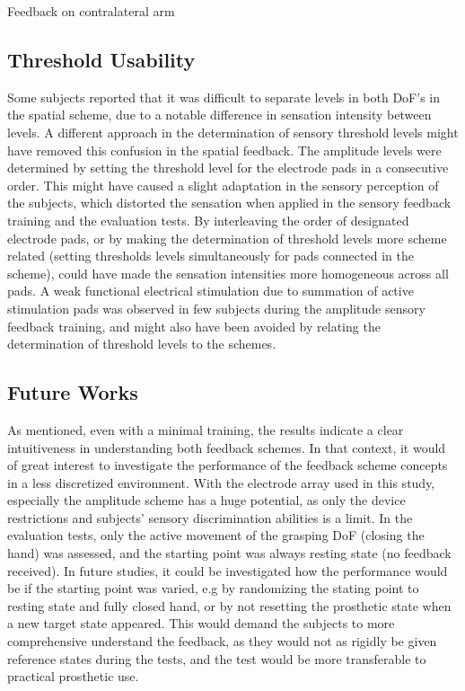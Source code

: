 Feedback on contralateral arm 

\subsection{Threshold Usability }
Some subjects reported that it was difficult to separate levels in both DoF's in the spatial scheme, due to a notable difference in sensation intensity between levels. A different approach in the determination of sensory threshold levels might have removed this confusion in the spatial feedback. The amplitude levels were determined by setting the threshold level for the electrode pads in a consecutive order. This might have caused a slight adaptation in the sensory perception of the subjects, which distorted the sensation when applied in the sensory feedback training and the evaluation tests. By interleaving the order of designated electrode pads, or by making the determination of threshold levels more scheme related (setting thresholds levels simultaneously for pads connected in the scheme), could have made the sensation intensities more homogeneous across all pads. A weak functional electrical stimulation due to summation of active stimulation pads was observed in few subjects during the amplitude sensory feedback training, and might also have been avoided by relating the determination of threshold levels to the schemes. 

\subsection{Future Works}
As mentioned, even with a minimal training, the results indicate a clear intuitiveness in understanding both feedback schemes. In that context, it would of great interest to investigate the performance of the feedback scheme concepts in a less discretized environment. With the electrode array used in this study, especially the amplitude scheme has a huge potential, as only the device restrictions and subjects' sensory discrimination abilities is a limit.
In the evaluation tests, only the active movement of the grasping DoF (closing the hand) was assessed, and the starting point was always resting state (no feedback received). In future studies, it could be investigated how the performance would be if the starting point was varied, e.g by randomizing the stating point to resting state and fully closed hand, or by not resetting the prosthetic state when a new target state appeared. This would demand the subjects to more comprehensive understand the feedback, as they would not as rigidly be given reference states during the tests, and the test would be more transferable to practical prosthetic use.

